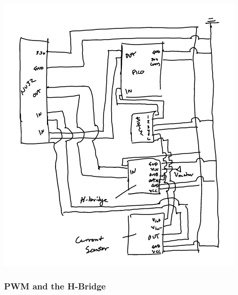 \documentclass{article}
\begin{document}
\begin{enumerate}[label=\textbf{\arabic*})]
        \includegraphics[width=\linewidth]{stripped_circuit.png}

    
\pagebreak
\end{enumerate}

\setcounter{section}{28}
\setcounter{subsection}{4}
\setcounter{subsubsection}{8}
\subsubsection{PWM and the H-Bridge}
\end{document}
